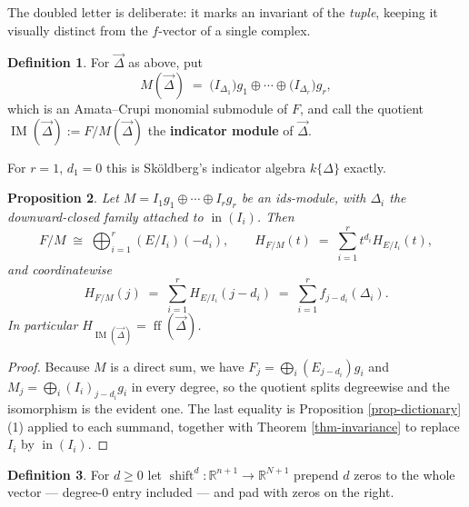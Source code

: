 \documentclass[11pt, a4paper, abstract=yes]{scrartcl}
\theoremstyle{definition}
\newtheorem{definition}{Definition}
\theoremstyle{remark}
\theoremstyle{plain}
\newtheorem{proposition}[definition]{Proposition}
\newcommand{\shift}{\operatorname{shift}}
\newcommand{\leannone}{\tikz[baseline=-0.6ex]\draw[leannone,line width=0.6pt] (0,0) circle (0.55ex);}
\newcommand{\compmark}{\tikz[baseline=-0.6ex]\fill[compmark] (-0.55ex,-0.55ex) rectangle (0.55ex,0.55ex);}
\newcommand{\leanmark}[1]{\leavevmode{\reversemarginpar\marginnote{\raggedleft#1}}}
\newcommand{\ff}{\operatorname{ff}}
\newcommand{\IM}{\operatorname{IM}}
\newcommand{\inn}{\operatorname{in}}
\begin{document}
The doubled letter is deliberate: it marks an invariant of the \emph{tuple}, keeping it visually distinct
from the \(f\)-vector of a single complex.

\begin{definition}
For \(\vec\Delta\) as above, put
\begin{equation}\label{eq:indicator-module}
  M(\vec\Delta)\;=\;\bigl(I_{\Delta_1}\bigr)g_1\oplus\cdots\oplus\bigl(I_{\Delta_r}\bigr)g_r,
\end{equation}
which is an Amata--Crupi monomial submodule of \(F\), and call the quotient
\(\IM(\vec\Delta):=F/M(\vec\Delta)\) the \textbf{indicator module} of \(\vec\Delta\).
\label{def-indicator-module}
\end{definition}

For \(r=1\), \(d_1=0\) this is Sköldberg's indicator algebra \(k\lbrace\Delta\rbrace\) exactly.

\begin{proposition}
\leanmark{\leannone\,\compmark}Let \(M=I_1g_1\oplus\cdots\oplus I_rg_r\) be an ids-module, with \(\Delta_i\) the downward-closed
family attached to \(\inn(I_i)\). Then
\begin{equation}\label{eq:splitting}
  F/M\;\cong\;\bigoplus_{i=1}^{r}(E/I_i)(-d_i),
  \qquad H_{F/M}(t)\;=\;\sum_{i=1}^{r}t^{d_i}H_{E/I_i}(t),
\end{equation}
and coordinatewise
\begin{equation}\label{eq:splitting-2}
  H_{F/M}(j)\;=\;\sum_{i=1}^{r}H_{E/I_i}(j-d_i)\;=\;\sum_{i=1}^{r}f_{j-d_i}(\Delta_i).
\end{equation}
In particular \(H_{\IM(\vec\Delta)}=\ff(\vec\Delta)\).
\label{prop:splitting}
\label{prop-splitting}
\end{proposition}

\begin{proof}
Because \(M\) is a direct sum, we have \(F_j=\bigoplus_i(E_{j-d_i})g_i\) and
\(M_j=\bigoplus_i(I_i)_{j-d_i}g_i\) in every degree, so the quotient splits degreewise and the
isomorphism is the evident one. The last
equality is Proposition \ref{prop-dictionary}(1) applied to each summand, together with
Theorem \ref{thm-invariance} to replace \(I_i\) by \(\inn(I_i)\).
\end{proof}

\begin{definition}
For \(d\ge0\) let \(\shift^d:\mathbb R^{n+1}\to\mathbb R^{N+1}\) prepend \(d\) zeros to the whole
vector --- degree-\(0\) entry included --- and pad with zeros on the right.
\label{def-shift}
\end{definition}
\end{document}
